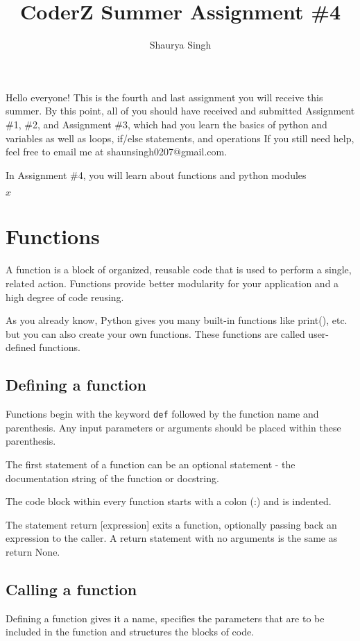 \documentclass{scrartcl}
\author{Shaurya Singh}
\date{}
\title{CoderZ Summer Assignment \#4}
\begin{document}
\maketitle
\setcounter{tocdepth}{2}
\tableofcontents

Hello everyone! This is the fourth and last assignment you will receive this
summer. By this point, all of you should have received and submitted Assignment
\#1, \#2, and Assignment \#3, which had you learn the basics of python and
variables as well as loops, if/else statements, and operations If you still need help, feel free to email me at shaunsingh0207@gmail.com.

In Assignment \#4, you will learn about functions and python modules

\(x\) 

\section{Functions}
\label{sec:org7e8ea0b}
A function is a block of organized, reusable code that is used to perform a single, related action. Functions provide better modularity for your application and a high degree of code reusing.

As you already know, Python gives you many built-in functions like print(), etc. but you can also create your own functions. These functions are called user-defined functions.

\subsection{Defining a function}
\label{sec:org5e69167}
Functions begin with the keyword \texttt{def} followed by the function name and
parenthesis. Any input parameters or arguments should be placed within these
parenthesis.

The first statement of a function can be an optional statement - the documentation string of the function or docstring.

The code block within every function starts with a colon (:) and is indented.

The statement return [expression] exits a function, optionally passing back an
expression to the caller. A return statement with no arguments is the same as
return None.

\subsection{Calling a function}
\label{sec:orga23ad85}
Defining a function gives it a name, specifies the parameters that are to be included in the function and structures the blocks of code.
\end{document}
